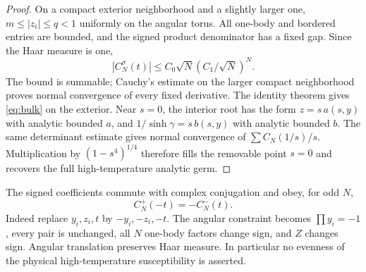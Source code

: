 \documentclass[11pt]{article}
\numberwithin{equation}{section}
\theoremstyle{remark}\newtheorem{remark}[theorem]{Remark}
\begin{document}
\begin{proof}
On a compact exterior neighborhood and a slightly larger one,
$m\le|z_i|\le q<1$ uniformly on the angular torus.
All one-body and bordered entries are bounded, and the signed
product denominator has a fixed gap. Since the Haar measure is one,
\[
 |C_N^\sigma(t)|\le C_0\sqrt N(C_1/\sqrt N)^N.
\]
The bound is summable; Cauchy's estimate on the larger compact
neighborhood proves normal convergence of every fixed derivative.
The identity theorem gives \eqref{eq:bulk} on the exterior.
Near $s=0$, the interior root has the form $z=s\,a(s,y)$ with
analytic bounded $a$, and $1/\sinh\gamma=s\,b(s,y)$ with
analytic bounded $b$. The same determinant estimate gives normal
convergence of $\sum C_N(1/s)/s$. Multiplication by
$(1-s^4)^{1/4}$ therefore fills the removable point $s=0$ and
recovers the full high-temperature analytic germ.
\end{proof}

The signed coefficients commute with complex conjugation and obey,
for odd $N$,
\begin{equation}\label{eq:negation}
 C_N^+(-t)=-C_N^-(t).
\end{equation}
Indeed replace $y_i,z_i,t$ by $-y_i,-z_i,-t$.
The angular constraint becomes $\prod y_i=-1$, every pair is
unchanged, all $N$ one-body factors change sign, and $Z$ changes
sign. Angular translation preserves Haar measure.
In particular no evenness of the physical high-temperature
susceptibility is asserted.
\end{document}
